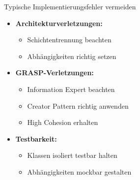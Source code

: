 \begin{KR}{Typische Implementierungsfehler vermeiden}\\
\begin{itemize}
    \item \textbf{Architekturverletzungen:}
    \begin{itemize}
        \item Schichtentrennung beachten
        \item Abhängigkeiten richtig setzen
    \end{itemize}
    
    \item \textbf{GRASP-Verletzungen:}
    \begin{itemize}
        \item Information Expert beachten
        \item Creator Pattern richtig anwenden
        \item High Cohesion erhalten
    \end{itemize}
    
    \item \textbf{Testbarkeit:}
    \begin{itemize}
        \item Klassen isoliert testbar halten
        \item Abhängigkeiten mockbar gestalten
    \end{itemize}
\end{itemize}
\end{KR}




